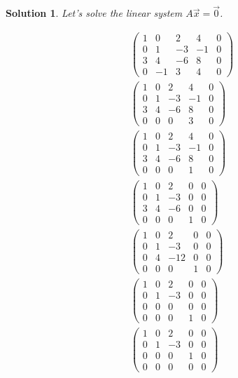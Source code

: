 \documentclass{article}
\newtheorem*{solution}{Solution}
\begin{document}
\begin{solution}
Let's solve the linear system $A\vec{x} = \vec{0}$.

\begin{align*}
\left( \begin{array}{cccc|c} 1 & 0 & 2 & 4 & 0 \\ 0 & 1 & -3 & -1 & 0 \\ 3 & 4 & -6 & 8 & 0\\ 0 & -1 & 3 & 4 & 0 \end{array} \right) \\
\left( \begin{array}{cccc|c} 1 & 0 & 2 & 4 & 0 \\ 0 & 1 & -3 & -1 & 0 \\ 3 & 4 & -6 & 8 & 0\\ 0 & 0 & 0 & 3 & 0 \end{array} \right) \\
\left( \begin{array}{cccc|c} 1 & 0 & 2 & 4 & 0 \\ 0 & 1 & -3 & -1 & 0 \\ 3 & 4 & -6 & 8 & 0\\ 0 & 0 & 0 & 1 & 0 \end{array} \right) \\
\left( \begin{array}{cccc|c} 1 & 0 & 2 & 0 & 0 \\ 0 & 1 & -3 & 0 & 0 \\ 3 & 4 & -6 & 0 & 0\\ 0 & 0 & 0 & 1 & 0 \end{array} \right) \\
\left( \begin{array}{cccc|c} 1 & 0 & 2 & 0 & 0 \\ 0 & 1 & -3 & 0 & 0 \\ 0 & 4 & -12 & 0 & 0\\ 0 & 0 & 0 & 1 & 0 \end{array} \right) \\
\left( \begin{array}{cccc|c} 1 & 0 & 2 & 0 & 0 \\ 0 & 1 & -3 & 0 & 0 \\ 0 & 0 & 0 & 0 & 0\\ 0 & 0 & 0 & 1 & 0 \end{array} \right) \\
\left( \begin{array}{cccc|c} 1 & 0 & 2 & 0 & 0 \\ 0 & 1 & -3 & 0 & 0 \\ 0 & 0 & 0 & 1 & 0 \\ 0 & 0 & 0 & 0 & 0 \end{array} \right) \\
\end{align*}


\end{solution}
\end{document}
